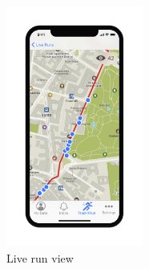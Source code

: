 \begin{figure}[H]
	\centering
	\includegraphics[width=0.4\textwidth]{./Pictures/Mockup/mobile/visitor_view.png}
	\captionsetup{skip=0pt}
	\caption{Live run view}
\end{figure}




























